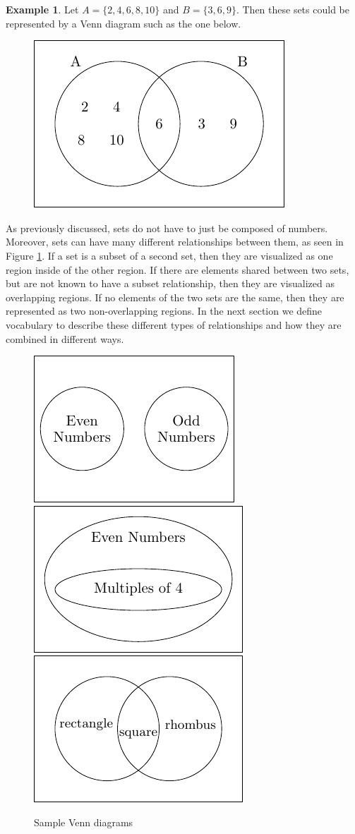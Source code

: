 \documentclass[
]{book}
\theoremstyle{definition}
\theoremstyle{definition}
\newtheorem{example}{Example}[chapter]
\theoremstyle{definition}
\theoremstyle{remark}
\begin{document}
\begin{example}
\protect\hypertarget{exm:unnamed-chunk-10}{}{\label{exm:unnamed-chunk-10} } Let \(A=\{2, 4, 6, 8, 10\}\) and \(B=\{3, 6, 9\}\). Then these sets could be represented by a Venn diagram such as the one below.
\end{example}
\begin{figure}

{\centering \includegraphics[width=0.35\linewidth]{tikz/VennEx2-1-6} 

}

\end{figure}

As previously discussed, sets do not have to just be composed of numbers. Moreover, sets can have many different relationships between them, as seen in Figure \ref{fig:venn-samples}. If a set is a subset of a second set, then they are visualized as one region inside of the other region. If there are elements shared between two sets, but are not known to have a subset relationship, then they are visualized as overlapping regions. If no elements of the two sets are the same, then they are represented as two non-overlapping regions. In the next section we define vocabulary to describe these different types of relationships and how they are combined in different ways.

\begin{figure}

{\centering \includegraphics[width=0.3\linewidth]{tikz/evenodd} \includegraphics[width=0.3\linewidth]{tikz/evenfours} \includegraphics[width=0.3\linewidth]{tikz/rectsqrhombus} 

}

\caption{Sample Venn diagrams}\label{fig:venn-samples}
\end{figure}
\end{document}
